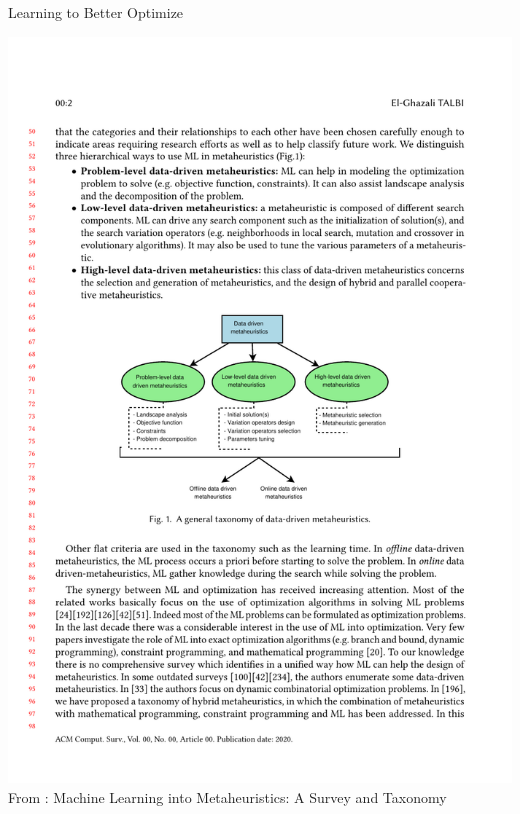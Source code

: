 \documentclass[aspectratio=1610]{beamer}
\renewcommand{\footnotesize}{\scriptsize}
\begin{document}
\begin{frame}{Learning to Better Optimize}
	\begin{center}
		\includegraphics[width=0.80\linewidth]{graphics/talbi-data-driven-mhs}\\[2ex]
    \footnotesize{From \citet{talbi-21}: Machine Learning into Metaheuristics: A Survey and Taxonomy}
	\end{center}
\end{frame}
\end{document}
